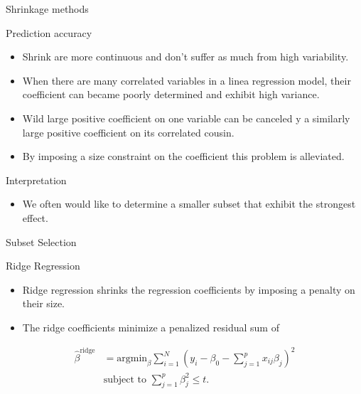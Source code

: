 \documentclass[
  ignorenonframetext,
  aspectratio=32,
]{beamer}
\providecommand{\tightlist}{%
  \setlength{\itemsep}{0pt}\setlength{\parskip}{0pt}}\usepackage{longtable,booktabs,array}
\begin{document}
\begin{frame}{Shrinkage methods}
\protect\hypertarget{shrinkage-methods}{}
\begin{block}{Prediction accuracy}
\protect\hypertarget{prediction-accuracy}{}
\begin{itemize}
\item
  Shrink are more continuous and don't suffer as much from high
  variability.
\item
  When there are many correlated variables in a linea regression model,
  their coefficient can became poorly determined and exhibit high
  variance.
\item
  Wild large positive coefficient on one variable can be canceled y a
  similarly large positive coefficient on its correlated cousin.
\item
  By imposing a size constraint on the coefficient this problem is
  alleviated.
\end{itemize}
\end{block}

\begin{block}{Interpretation}
\protect\hypertarget{interpretation}{}
\begin{itemize}
\tightlist
\item
  We often would like to determine a smaller subset that exhibit the
  strongest effect.
\end{itemize}
\end{block}
\end{frame}

\begin{frame}{Subset Selection}
\protect\hypertarget{subset-selection}{}
\end{frame}

\begin{frame}{Ridge Regression}
\protect\hypertarget{ridge-regression}{}
\begin{itemize}
\item
  Ridge regression shrinks the regression coefficients by imposing a
  penalty on their size.
\item
  The ridge coefficients minimize a penalized residual sum of
\end{itemize}

\begin{align}
\hat{\beta}^{\text{ridge}}
& = 
\text{argmin}_\beta
    \sum_{i = 1}^N
    \left(
        y_i - \beta_0 
        - \sum_{j = 1}^p
        x_{i j} \beta_j
    \right)^2
\\
\nonumber
&
\text{subject to }
\sum_{j = 1}^p \beta_j^2 \leq t.
\end{align}
\end{frame}
\end{document}
